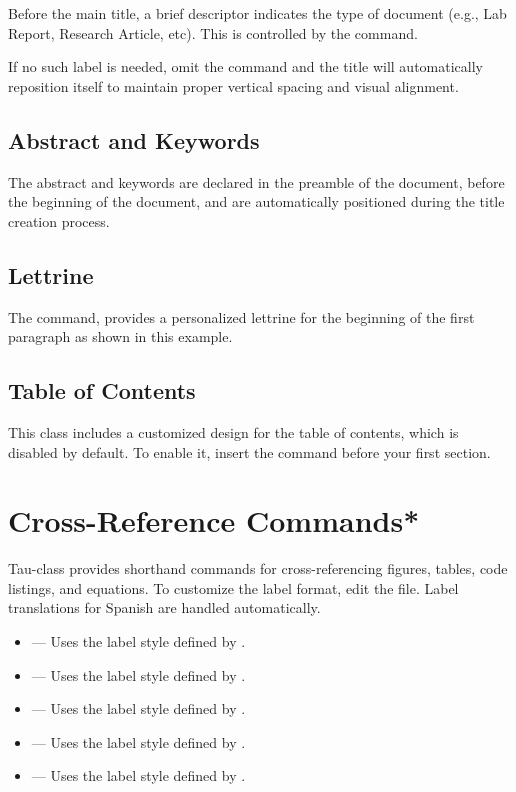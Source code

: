 \documentclass[9pt,a4paper,twocolumn,twoside]{tau-class/tau}
\begin{document}
        Before the main title, a brief descriptor indicates the type of document (e.g., Lab Report, Research Article, etc). This is controlled by the \inlinecode{\doctype{}} command. 
        
        If no such label is needed, omit the command and the title will automatically reposition itself to maintain proper vertical spacing and visual alignment.

    \subsection{Abstract and Keywords}

        The abstract and keywords are declared in the preamble of the document, before the beginning of the document, and are automatically positioned during the title creation process.

    \subsection{Lettrine}

		The \inlinecode{\taustart{}} command, provides a personalized lettrine for the beginning of the first paragraph as shown in this example.

	\subsection{Table of Contents}

        This class includes a customized design for the table of contents, which is disabled by default. To enable it, insert the \inlinecode{\tableofcontents} command before your first section.

    \section{Cross-Reference Commands*}

        Tau-class provides shorthand commands for cross-referencing figures, tables, code listings, and equations. To customize the label format, edit the  file. Label translations for Spanish are handled automatically.

        \begin{itemize}
            \item \inlinecode{\figref{}} — Uses the label style defined by \inlinecode{\figlabel}.
            \item \inlinecode{\figsref{}} — Uses the label style defined by \inlinecode{\figslabel}.
            \item \inlinecode{\tabref{}} — Uses the label style defined by \inlinecode{\tablabel}.
            \item \inlinecode{\coderef{}}  — Uses the label style defined by \inlinecode{\captionlabelcode}.
            \item \inlinecode{\equref{}} — Uses the label style defined by \inlinecode{\eqlabel}.
        \end{itemize}
        
\end{document}
